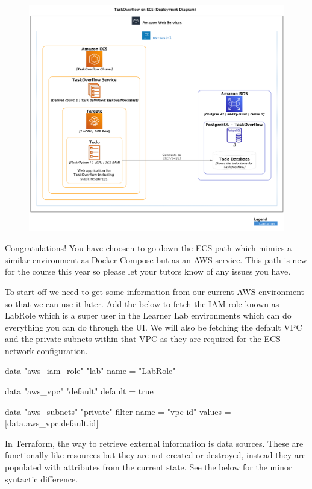 \documentclass{csse4400}
\begin{document}
\begin{figure}[H]
  \includegraphics[width=\textwidth]{diagrams/ecsdeployment}
\end{figure}

Congratulations! You have choosen to go down the ECS path which mimics a similar environment as Docker Compose but as an AWS service.
This path is new for the course this year so please let your tutors know of any issues you have.

To start off we need to get some information from our current AWS environment so that we can use it later.
Add the below to fetch the IAM role known as LabRole which is a super user in the Learner Lab environments which can do everything you can do through the UI.
We will also be fetching the default VPC and the private subnets within that VPC as they are required for the ECS network configuration.

\begin{code}[language=terraform,numbers=none]{}
data "aws_iam_role" "lab" {
    name = "LabRole"
}

data "aws_vpc" "default" {
    default = true
}

data "aws_subnets" "private" {
    filter {
        name   = "vpc-id"
        values = [data.aws_vpc.default.id]
    }
}
\end{code}

In Terraform, the way to retrieve external information is data sources.
These are functionally like resources but they are not created or destroyed,
instead they are populated with attributes from the current state.
See the below for the minor syntactic difference.
\end{document}
